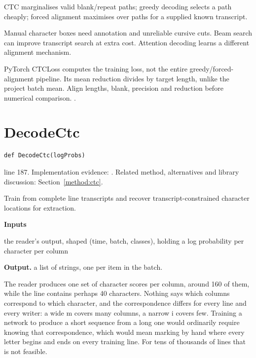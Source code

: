 CTC marginalises valid blank/repeat paths; greedy decoding selects a path cheaply; forced alignment maximises over paths for a supplied known transcript.


Manual character boxes need annotation and unreliable cursive cuts. Beam search can improve transcript search at extra cost. Attention decoding learns a different alignment mechanism.


PyTorch CTCLoss computes the training loss, not the entire greedy/forced-alignment pipeline. Its mean reduction divides by target length, unlike the project batch mean. Align lengths, blank, precision and reduction before numerical comparison. \cite{graves2006,ctcdistill,torchctc}.


\section{DecodeCtc}\label{fn:recognise:DecodeCtc}
\begin{lstlisting}[style=sig]
def DecodeCtc(logProbs)
\end{lstlisting}
 line 187. Implementation evidence: \cite{code2026}. Related method, alternatives and library discussion: Section~\ref{method:ctc}.


Train from complete line transcripts and recover transcript-constrained character locations for extraction.




\noindent\textbf{Inputs}
\begin{description}[leftmargin=2.2em,style=nextline,font=\normalfont\ttfamily]\setlength\itemsep{1pt}
  \item[{logProbs}] \normalfont the reader's output, shaped (time, batch, classes), holding a log probability per character per column
\end{description}

\noindent\textbf{Output.} a list of strings, one per item in the batch.


The reader produces one set of character scores per column, around 160 of them, while the line contains perhaps 40 characters. Nothing says which columns correspond to which character, and the correspondence differs for every line and every writer: a wide m covers many columns, a narrow i covers few. Training a network to produce a short sequence from a long one would ordinarily require knowing that correspondence, which would mean marking by hand where every letter begins and ends on every training line. For tens of thousands of lines that is not feasible.

